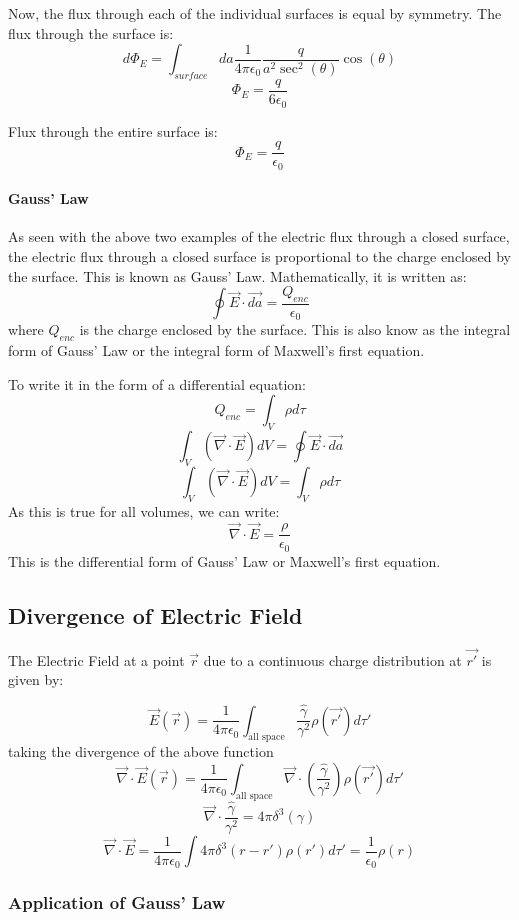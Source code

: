 \documentclass{article}
\begin{document}
Now, the flux through each of the individual surfaces is equal by symmetry.
The flux through the surface is:
\[d\Phi_E = \int_{surface} da \frac{1}{4\pi\epsilon_0} \frac{q}{a^2 \sec^2(\theta)} \cos(\theta) \]
\[ \Phi_E = \frac{q}{6\epsilon_0} \]

Flux through the entire surface is:
\[ \Phi_E = \frac{q}{\epsilon_0} \]

\paragraph{Gauss' Law}
As seen with the above two examples of the electric flux through a closed surface, the electric flux through a closed surface is proportional to the charge enclosed by the surface. 
This is known as Gauss' Law. 
Mathematically, it is written as:
\[\oint \vec{E} \cdot \vec{da} = \frac{Q_{enc}}{\epsilon_0}\]
where $Q_{enc}$ is the charge enclosed by the surface.
This is also know as the integral form of Gauss' Law or the integral form of Maxwell's first equation.

To write it in the form of a differential equation:\\
\[Q_{enc} = \int_{V}\rho d\tau \]
\[\int_V (\vec{\nabla} \cdot \vec{E}) dV = \oint \vec{E} \cdot \vec{da} \]
\[ \int_V (\vec{\nabla} \cdot \vec{E}) dV = \int_{V}\rho d\tau \]
As this is true for all volumes, we can write:
\[\vec{\nabla} \cdot \vec{E} = \frac{\rho}{\epsilon_0}\]
This is the differential form of Gauss' Law or Maxwell's first equation.

\subsection{Divergence of Electric Field}

The Electric Field at a point $\vec{r}$ due to a continuous charge distribution at $\vec{r'}$ is given by:

\[\vec{E}(\vec{r}) = \frac{1}{4 \pi \epsilon_0} \int_{\text{all space}} \frac{\hat{\gamma}}{\gamma^2} \rho(\vec{r'}) d\tau' \]
taking the divergence of the above function
\[ \vec{\nabla} \cdot \vec{E}(\vec{r}) = \frac{1}{4 \pi \epsilon_0} \int_{\text{all space}} \vec{\nabla} \cdot \left(\frac{\hat{\gamma}}{\gamma^2}\right) \rho(\vec{r'}) d\tau' \]
\[\vec{\nabla}\cdot\frac{\hat{\gamma}}{\gamma^2} = 4 \pi \delta^3(\gamma)\]
\[ \vec{\nabla} \cdot \vec{E} = \frac{1}{4 \pi \epsilon_0} \int 4 \pi \delta^3(r-r') \rho(r') d\tau' = \frac{1}{\epsilon_0} \rho(r)\]

\subsubsection{Application of Gauss' Law} 
\end{document}
